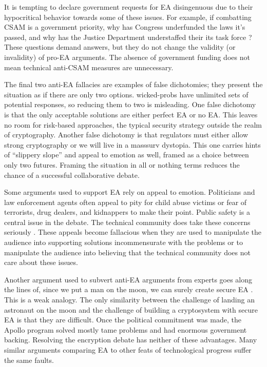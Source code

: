It is tempting to declare government requests for \ac{EA} disingenuous due to their hypocritical behavior towards some
of these issues. For example, if combatting \ac{CSAM} is a government priority, why has Congress underfunded the laws
it's passed, and why has the Justice Department understaffed their its task force \cite{keller_internet_2019}? These
questions demand answers, but they do not change the validity (or invalidity) of pro-\ac{EA} arguments. The absence of
government funding does not mean technical anti-\ac{CSAM} measures are unnecessary.

The final two anti-\ac{EA} fallacies are examples of false dichotomies; they present the situation as if there are only
two options. \Acp{wicked-prob} have unlimited sets of potential responses, so reducing them to two is misleading. One
false dichotomy is that the only acceptable solutions are either perfect \ac{EA} or no \ac{EA}. This leaves no room for
risk-based approaches, the typical security strategy outside the realm of cryptography. Another false dichotomy is that
regulators must either allow strong cryptography or we will live in a \ac{masssurv} dystopia. This one carries hints of
``slippery slope'' and appeal to emotion as well, framed as a choice between only two futures. Framing the situation in
all or nothing terms reduces the chance of a successful collaborative debate.

Some arguments used to support \ac{EA} rely on appeal to emotion. Politicians and law enforcement agents often appeal to
pity for child abuse victims or fear of terrorists, drug dealers, and kidnappers to make their point. Public safety is a
central issue in the debate. The technical community does take these concerns seriously \cite{schneier_scaring_2019}.
These appeals become fallacious when they are used to manipulate the audience into supporting solutions incommensurate
with the problems or to manipulate the audience into believing that the technical community does not care about these
issues.

Another argument used to subvert anti-EA arguments from experts goes along the lines of, since we put a man on the moon,
we can surely create secure \ac{EA} \cite{cushing_moon_2018}. This is a weak analogy. The only similarity between the
challenge of landing an astronaut on the moon and the challenge of building a cryptosystem with secure EA is that they
are difficult. Once the political commitment was made, the Apollo program solved mostly tame problems and had enormous
government backing. Resolving the encryption debate has neither of these advantages. Many similar arguments comparing
\ac{EA} to other feats of technological progress suffer the same faults.

